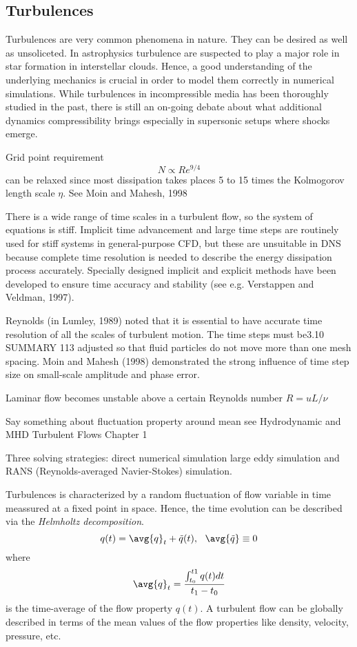 \subsection{Turbulences}

Turbulences are very common phenomena in nature. They can be desired as well as
unsoliceted. In astrophysics turbulence are suspected to play a major role in
star formation in interstellar clouds. Hence, a good understanding of the
underlying mechanics is crucial in order to model them correctly in numerical
simulations. While turbulences in incompressible media has been thoroughly
studied in the past, there is still an on-going debate about what additional
dynamics compressibility brings especially in supersonic setups where shocks
emerge.

Grid point requirement
\begin{equation}
    N \varpropto Re^{9/4}
\end{equation}
can be relaxed since most dissipation takes places 5 to 15 times the
Kolmogorov length scale $\eta$. See Moin and Mahesh, 1998

There is a wide range of time scales in a turbulent flow, so the system of
equations is stiff. Implicit time advancement and large time steps are
routinely used for stiff systems in general-purpose CFD, but these are
unsuitable in DNS because complete time resolution is needed to describe
the energy dissipation process accurately. Specially designed implicit and
explicit methods have been developed to ensure time accuracy and stability
(see e.g. Verstappen and Veldman, 1997).

Reynolds (in Lumley, 1989) noted that it is essential to have accurate time
resolution of all the scales of turbulent motion. The time steps must be3.10 SUMMARY
113
adjusted so that fluid particles do not move more than one mesh spacing.
Moin and Mahesh (1998) demonstrated the strong influence of time step size
on small-scale amplitude and phase error.


Laminar flow becomes unstable above a certain Reynolds number $R = u L/\nu$

Say something about fluctuation property around mean
see Hydrodynamic and MHD Turbulent Flows Chapter 1

Three solving strategies: direct numerical simulation
large eddy simulation and RANS (Reynolds-averaged Navier-Stokes) simulation.

Turbulences is characterized by a random fluctuation of flow variable in time
meassured at a fixed point in space. Hence, the time evolution can be described
via the \emph{Helmholtz decomposition}.
\begin{equation}
    q(t) = \avg{q}_t + \tilde{q}(t), \ \ \avg{\tilde{q}} \equiv 0
\end{equation}
where 
\begin{equation}
    \avg{q}_t = \frac{\int_{t_0}^{t1} q(t) dt}{t_1 - t_0}
\end{equation}
is the time-average of the flow property $q(t)$. A turbulent flow can be
globally described in terms of the mean values of the flow properties like
density, velocity, pressure, etc.

